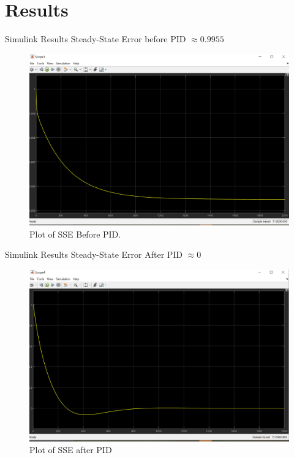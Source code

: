 \documentclass[10pt,compress,mathserif]{beamer}
\begin{document}
\section{Results}
\begin{frame}{Simulink Results}
Steady-State Error before PID \( \approx 0.9955 \)

\begin{figure}[h!]
	\centering
	\includegraphics[scale=0.35]{images/SSE_BeforePID_Simulink.png}
	\caption{Plot of SSE Before PID.}
\end{figure}



\end{frame}

\begin{frame}{Simulink Results}
Steady-State Error After PID \( \approx 0 \)
	\begin{figure}[h!]
		\centering
		\includegraphics[scale=0.35]{images/SSE_AfterPID_Simulink.png}
		\caption{Plot of SSE after PID}
	\end{figure}
\end{frame}
\end{document}
